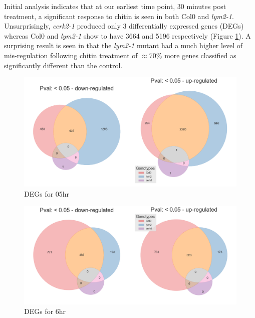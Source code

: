 \documentclass[../main.tex]{subfiles}
\begin{document}
Initial analysis indicates that at our earliest time point, 30 minutes post
treatment, a significant response to chitin is seen in both Col0 and
\textit{lym2-1}. Unsurprisingly, \textit{cerk2-1} produced only 3 differentially
expressed genes (DEGs) whereas Col0 and \textit{lym2-1} show to have 3664 and
5196 respectively (Figure \ref{fig:05hrDEGs}). A surprising result is seen in that the
\textit{lym2-1} mutant had a much higher level of mis-regulation following
chitin treatment of $\approx70\%$ more genes classified as significantly different
than the control.




\begin{figure}[ht]
  \centering
  \includegraphics[width=\columnwidth]{figures/vennTreatmentschitin.png}
  \caption{\label{fig:05hrDEGs} DEGs for 05hr}
\end{figure}



\begin{figure}[ht]
  \centering
  \includegraphics[width=\columnwidth]{figures/vennTreatmentschitin6.png}
  \caption{\label{fig:6hrDEGs} DEGs for 6hr}
\end{figure}
\end{document}
